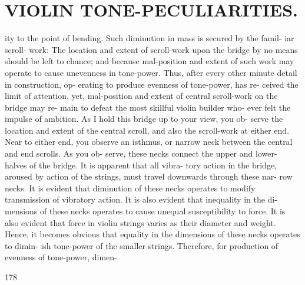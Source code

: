 \documentclass{article}
\begin{document}
\section*{VIOLIN TONE-PECULIARITIES.}
ity to the point of bending. Such diminution in mass is secured by the famil- iar scroll- work: The location and extent of scroll-work upon the bridge by no means should be left to chance; and because mal-position and extent of such work may operate to cause unevenness in tone-power. Thus, after every other minute detail in construction, op- erating to produce evenness of tone-power, has re- ceived the limit of attention, yet, mal-position and extent of central scroll-work on the bridge may re- main to defeat the most skillful violin builder who- ever felt the impulse of ambition. As I hold this bridge up to your view, you ob- serve the location and extent of the central scroll, and also the scroll-work at either end. Near to either end, you observe an isthmus, or narrow neck between the central and end scrolls. As you ob- serve, these necks connect the upper and lower- halves of the bridge. It is apparent that all vibra- tory action in the bridge, aroused by action of the strings, must travel downwards through these nar- row necks. It is evident that diminution of these necks operates to modify transmission of vibratory action. It is also evident that inequality in the di- mensions of these necks operates to cause unequal susceptibility to force. It is also evident that force in violin strings varies as their diameter and weight. Hence, it becomes obvious that equality in the dimensions of these necks operates to dimin- ish tone-power of the smaller strings. Therefore, for production of evenness of tone-power, dimen-

178
\end{document}
